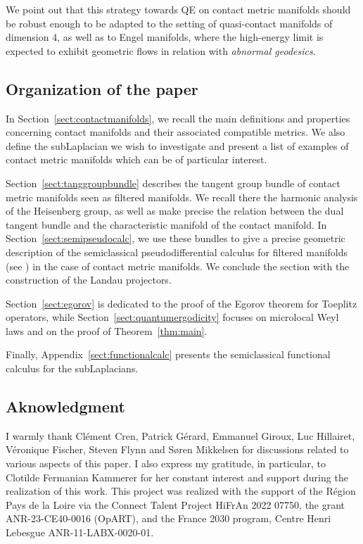 \documentclass[12pt,a4paper]{amsart}
\theoremstyle{plain}
\theoremstyle{definition}
\theoremstyle{remark}
\numberwithin{equation}{section}
\theoremstyle{definition}
\numberwithin{equation}{section}
\begin{document}
We point out that this strategy towards QE on contact metric manifolds should be robust enough to be adapted to the setting of quasi-contact manifolds of dimension 4, as well as to Engel manifolds, where the high-energy limit is expected to exhibit geometric flows in relation with \emph{abnormal geodesics}.

\subsection{Organization of the paper}

In Section~\ref{sect:contactmanifolds}, we recall the main definitions and properties concerning contact manifolds and their associated compatible metrics. We also define the subLaplacian we wish to investigate and present a list of examples of contact metric manifolds which can be of particular interest.

Section~\ref{sect:tanggroupbundle} describes the tangent group bundle of contact metric manifolds seen as filtered manifolds. We recall there the harmonic analysis of the Heisenberg group, as well as make precise the relation between the dual tangent bundle and the characteristic manifold of the contact manifold.
In Section~\ref{sect:semipseudocalc}, we use these bundles to give a precise geometric description of the semiclassical pseudodifferential calculus for filtered manifolds (see \cite{BFF25}) in the case of contact metric manifolds. We conclude the section with the construction of the Landau projectors.

Section~\ref{sect:egorov} is dedicated to the proof of the Egorov theorem for Toeplitz operators, while Section~\ref{sect:quantumergodicity} focuses on microlocal Weyl laws and on the proof of Theorem~\ref{thm:main}.

Finally, Appendix~\ref{sect:functionalcalc} presents the semiclassical functional calculus for the subLaplacians.

\subsection{Aknowledgment} I warmly thank Clément Cren, Patrick Gérard, Emmanuel Giroux, Luc Hillairet, Véronique Fischer, Steven Flynn and Søren Mikkelsen for discussions related to various aspects of this paper. I also express my gratitude, in particular, to Clotilde Fermanian Kammerer for her constant interest and support during the realization of this work. This project was realized with the support of the Région Pays de la Loire via the Connect Talent Project HiFrAn 2022 07750, the grant ANR-23-CE40-0016 (OpART), and the France 2030 program, Centre Henri Lebesgue ANR-11-LABX-0020-01.
\end{document}
